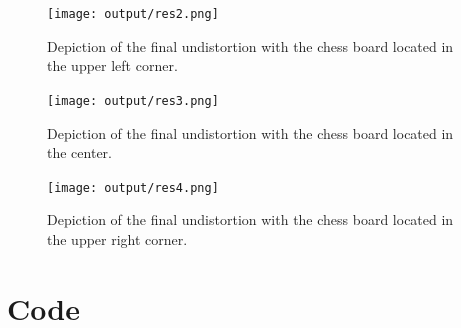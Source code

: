 \documentclass[twocolumn,10pt]{asme2ej}
\begin{document}
\begin{figure}[H]
    \onecolumn\centerline{\texttt{[image: output/res2.png]}}
    \caption{Depiction of the final undistortion with the chess board located in the upper left corner.}
    \label{fig:res2}
\end{figure}

\begin{figure}[H]
    \onecolumn\centerline{\texttt{[image: output/res3.png]}}
    \caption{Depiction of the final undistortion with the chess board located in the center.}
    \label{fig:res3}
\end{figure}

\begin{figure}[H]
    \onecolumn\centerline{\texttt{[image: output/res4.png]}}
    \caption{Depiction of the final undistortion with the chess board located in the upper right corner.}
    \label{fig:res4}
\end{figure}
\twocolumn
\onecolumn
\section{Code}

\twocolumn



\end{document}
